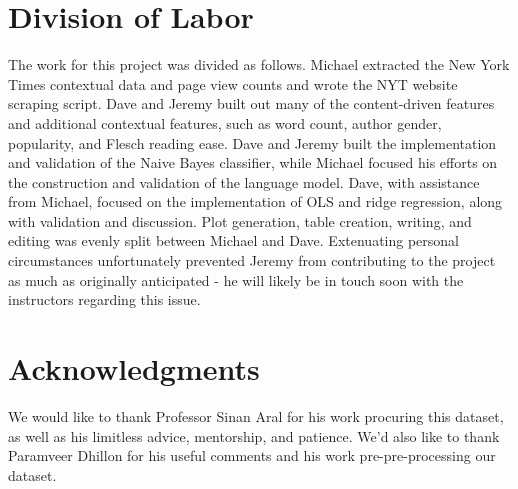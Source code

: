 \documentclass[fleqn,12pt]{SelfArx} %
\begin{document}
\section{Division of Labor}

The work for this project was divided as follows. Michael extracted the New York Times contextual data and page view counts and wrote the NYT website scraping script. Dave and Jeremy built out many of the content-driven features and additional contextual features, such as word count, author gender, popularity, and Flesch reading ease. Dave and Jeremy built the implementation and validation of the Naive Bayes classifier, while Michael focused his efforts on the construction and validation of the language model. Dave, with assistance from Michael, focused on the implementation of OLS and ridge regression, along with validation and discussion. Plot generation, table creation, writing, and editing was evenly split between Michael and Dave. Extenuating personal circumstances unfortunately prevented Jeremy from contributing to the project as much as originally anticipated - he will likely be in touch soon with the instructors regarding this issue.

\section*{Acknowledgments} %

We would like to thank Professor Sinan Aral for his work procuring this dataset, as well as his limitless advice, mentorship, and patience. We'd also like to thank Paramveer Dhillon for his useful comments and his work pre-pre-processing our dataset.





\end{document}
